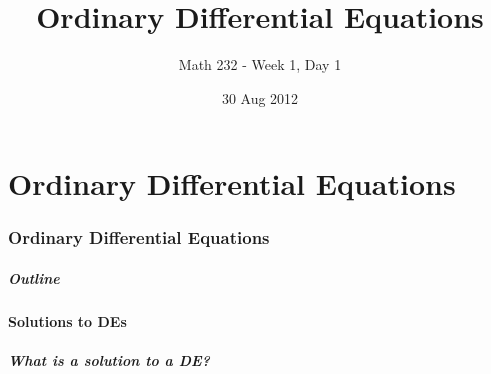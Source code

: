 

\part{Ordinary Differential Equations}
\section{Ordinary Differential Equations}

\title{Ordinary Differential Equations}
\subtitle{Math 232 - Week 1, Day 1}
\date{30 Aug 2012}

\begin{frame}
  \titlepage
\end{frame}

\begin{frame}
  \frametitle{Outline}
  \tableofcontents[ currentsection ]
\end{frame}


\subsection{Solutions to DEs}


\begin{frame}
  \frametitle{What is a solution to a DE?}


\end{frame}


\begin{frame}
  \frametitle{}


\end{frame}


\begin{frame}
  \frametitle{}


\end{frame}


\begin{frame}
  \frametitle{}


\end{frame}


\begin{frame}
  \frametitle{}


\end{frame}


\begin{frame}
  \frametitle{}


\end{frame}


\begin{frame}
  \frametitle{}


\end{frame}


\begin{frame}
  \frametitle{}


\end{frame}


\begin{frame}
  \frametitle{}


\end{frame}



